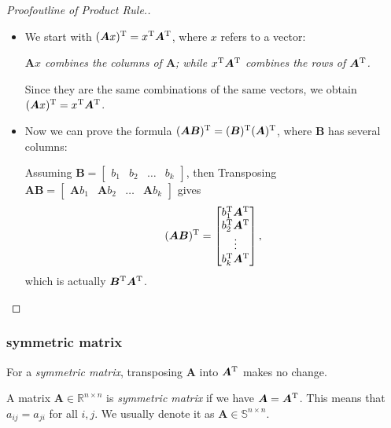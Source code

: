 \begin{proof}[Proofoutline of Product Rule.]\quad\\

\begin{itemize}
\item
We start with $(\bm{A}x)^{\mathrm T} = x^{\mathrm T}\bm A^{\mathrm T}$, where $x$ refers to a vector: 

\emph{$\bm{A}x$ combines the columns of $\bm A$; while $x^{\mathrm T}\bm A^{\mathrm T}$ combines the rows of $\bm A^{\mathrm T}$.}

Since they are the same combinations of the same vectors, we obtain $(\bm{A}x)^{\mathrm T} = x^{\mathrm T}\bm A^{\mathrm T}$.
\item
Now we can prove the formula $(\bm{AB})^{\mathrm T} = (\bm B)^{\mathrm T}(\bm A)^{\mathrm T}$, where $\bm B$ has several columns:

Assuming $\bm B = \left[
\begin{array}{c|c|c|c}
b_1&b_2&\ldots&b_k
\end{array}\right]$, then Transposing $\bm{AB} = \left[
\begin{array}{c|c|c|c}
\bm Ab_1&\bm Ab_2&\ldots&\bm Ab_k
\end{array}\right]$ gives
\[
(\bm A\bm B)^{\mathrm T} = \begin{bmatrix}
b_1^{\mathrm T}\bm A^{\mathrm T}\\b_2^{\mathrm T}\bm A^{\mathrm T}\\\vdots\\b_k^{\mathrm T}\bm A^{\mathrm T}
\end{bmatrix},
\]
which is actually $\bm B^{\mathrm T}\bm A^{\mathrm T}$.
\end{itemize}
\end{proof}
\subsubsection{symmetric matrix}
For a \textit{symmetric matrix}, transposing $\bm A$ into $\bm A^{\mathrm T}$ makes no change.
\begin{definition}
A matrix $\bm A\in\mathbb{R}^{n\times n}$ is \emph{symmetric matrix} if we have $\bm A = \bm A^{\mathrm T}$. This means that $a_{ij} = a_{ji}$ for all $i,j$. We usually denote it as $\bm A\in\mathbb{S}^{n\times n}$.
\end{definition}

